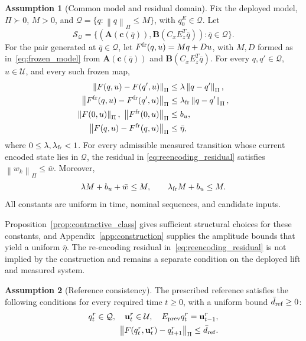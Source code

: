 \documentclass[journal]{IEEEtran}
\theoremstyle{plain}
\theoremstyle{definition}
\newtheorem{assumption}{Assumption}
\newcommand{\envend}{\leavevmode\unskip\penalty9999 \hbox{}\nobreak\hfill\quad\hbox{\IEEEQEDopen}}
\newcommand{\vu}{\mathbf{u}}
\newcommand{\vc}{\mathbf{c}}
\newcommand{\mA}{\mathbf{A}}
\newcommand{\mB}{\mathbf{B}}
\newcommand{\norm}[1]{\left\lVert #1\right\rVert}
\begin{document}
\begin{assumption}[Common model and residual domain]
\label{ass:domain}
Fix the deployed model, $\Pi\succ0$, $M>0$, and $\mathcal Q=\{q:\norm{q}_\Pi\le M\}$, with $q_0^E\in\mathcal Q$. Let
\begin{equation}
\mathcal S_{\mathcal Q}=\{(\mA(\vc(\bar q)),\mB(C_xE_z^T\bar q)):
\bar q\in\mathcal Q\}.
\label{eq:frozen_family}
\end{equation}
For the pair generated at $\bar q\in\mathcal Q$, let $F^{\rm fr}(q,u)=Mq+Du$, with $M,D$ formed as in~\eqref{eq:frozen_model} from $\mA(\vc(\bar q))$ and $\mB(C_xE_z^T\bar q)$. For every $q,q'\in\mathcal Q$, $u\in\mathcal U$, and every such frozen map,
\begin{align}
\norm{F(q,u)-F(q',u)}_\Pi&\le\lambda\norm{q-q'}_\Pi,\nonumber\\
\norm{F^{\rm fr}(q,u)-F^{\rm fr}(q',u)}_\Pi&\le\lambda_{\rm fr}\norm{q-q'}_\Pi,\label{eq:common_contraction}\\
\norm{F(0,u)}_\Pi,\ \norm{F^{\rm fr}(0,u)}_\Pi&\le b_u,\nonumber\\
\norm{F(q,u)-F^{\rm fr}(q,u)}_\Pi&\le\bar\eta,\nonumber
\end{align}
where $0\le\lambda,\lambda_{\rm fr}<1$. For every admissible measured transition whose current encoded state lies in $\mathcal Q$, the residual in \eqref{eq:reencoding_residual} satisfies $\norm{w_k}_\Pi\le\bar w$. Moreover,
\begin{equation}
\lambda M+b_u+\bar w\le M,\qquad
\lambda_{\rm fr}M+b_u\le M.
\label{eq:domain_radius}
\end{equation}
All constants are uniform in time, nominal sequences, and candidate inputs.\envend
\end{assumption}

{Proposition~\ref{prop:contractive_class} gives sufficient structural choices for these constants, and Appendix~\ref{app:construction} supplies the amplitude bounds that yield a uniform $\bar\eta$. The re-encoding residual in~\eqref{eq:reencoding_residual} is not implied by the construction and remains a separate condition on the deployed lift and measured system.}

\begin{assumption}[Reference consistency]
\label{ass:reference}
{The prescribed reference satisfies the following conditions for every required time $t\ge0$, with a uniform bound $\bar d_{\rm ref}\ge0$:}
\begin{equation}
\begin{split}
q_t^r\in\mathcal Q,\quad \vu_t^r\in\mathcal U,\quad
E_{\rm prev}q_t^r=\vu_{t-1}^r,\\
\norm{F(q_t^r,\vu_t^r)-q_{t+1}^r}_\Pi\le\bar d_{\rm ref}.
\end{split}
\label{eq:reference_defect}
\end{equation}
\envend
\end{assumption}
\end{document}
